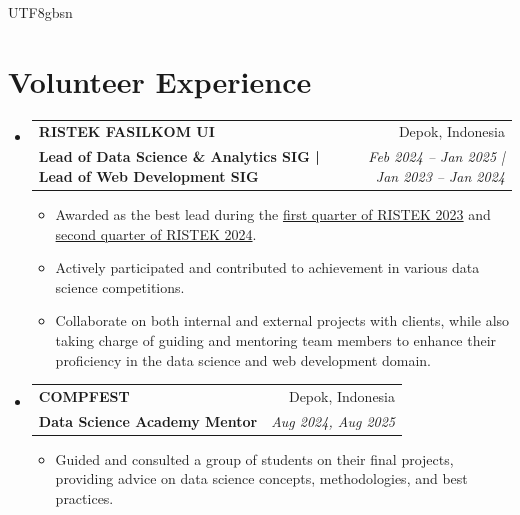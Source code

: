 \documentclass[letterpaper,10pt]{article}
\makeatletter
\newcommand{\resumeItem}[1]{
  \item\small{
    {#1 \vspace{0pt}}
  }
}
\newcommand{\resumeSubheading}[4]{
  \vspace{0pt}\item
    \begin{tabular*}{0.97\textwidth}[t]{l@{\extracolsep{\fill}}r}
      \textbf{\MakeUppercase{#1}} & #2 \\
      \textbf{\small#3} & \textit{\small #4} \\
    \end{tabular*}\vspace{0pt}
}
\newcommand{\resumeSubHeadingListStart}{\begin{itemize}[leftmargin=0.1in, label={}, itemsep=0pt, parsep=0pt]}
\newcommand{\resumeSubHeadingListEnd}{\end{itemize}}
\newcommand{\resumeItemListStart}{\begin{itemize}[itemsep=0pt, parsep=0pt, topsep=0pt]}
\newcommand{\resumeItemListEnd}{\end{itemize}\vspace{0pt}}
\makeatother
\begin{document}
\begin{CJK*}{UTF8}{gbsn}
	\section{Volunteer Experience}
	\resumeSubHeadingListStart
	\resumeSubheading
	{RISTEK FASILKOM UI}{Depok, Indonesia}
	{Lead of Data Science \& Analytics SIG | Lead of Web Development SIG}{Feb 2024 -- Jan 2025 | Jan 2023 -- Jan 2024}
	\resumeItemListStart
	\resumeItem{Awarded as the best lead during the \href{https://drive.google.com/file/d/1pP1CsDuR71Rs0owoqqicpCiUmuYeMwdL/view}{first quarter of RISTEK 2023} and \href{https://drive.google.com/file/d/1JvAupLQcdfikTIEoBEY6xJRka4_q4eNk/view?usp=drive_link}{second quarter of RISTEK 2024}.}
	\resumeItem{Actively participated and contributed to achievement in various data science competitions.}
	\resumeItem{Collaborate on both internal and external projects with clients, while also taking charge of guiding and mentoring team members to enhance their proficiency in the data science and web development domain.}
	\resumeItemListEnd

	\resumeSubheading
	{COMPFEST}{Depok, Indonesia}
	{Data Science Academy Mentor}{Aug 2024, Aug 2025}
	\resumeItemListStart
	\resumeItem{Guided and consulted a group of students on their final projects, providing advice on data science concepts, methodologies, and best practices.}
	\resumeItemListEnd
	\resumeSubHeadingListEnd


\end{CJK*}
\end{document}
